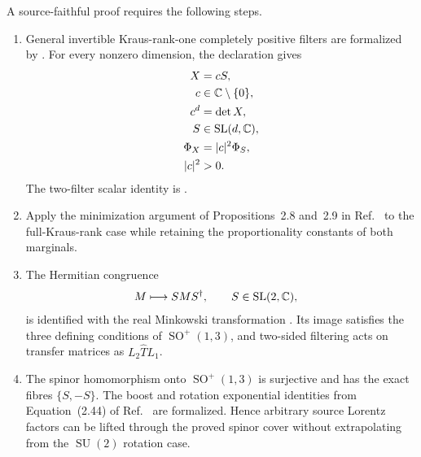 \documentclass{article}
\begin{document}
A source-faithful proof requires the following steps.
\begin{enumerate}
    \item[$\checkmark$] General invertible Kraus-rank-one completely positive
    filters are formalized by . For every
    nonzero dimension, the declaration
     gives
    \begin{align}
        X
            &=cS,
        \label{eq:wolf_prop2_11_lorentz_scalar_filtering_gap_general_dimension_factorization}\\
        c
            &\in\mathbb{C}\setminus\{0\},
        \label{eq:wolf_prop2_11_lorentz_scalar_filtering_gap_nonzero_scalar}\\
        c^d
            &=\det X,
        \label{eq:wolf_prop2_11_lorentz_scalar_filtering_gap_general_dimension_root}\\
        S
            &\in\operatorname{SL}(d,\mathbb{C}),
        \label{eq:wolf_prop2_11_lorentz_scalar_filtering_gap_general_dimension_sl}\\
        \Phi_X
            &=|c|^2\Phi_S,
        \label{eq:wolf_prop2_11_lorentz_scalar_filtering_gap_general_dimension_filter}\\
        |c|^2
            &>0.
        \label{eq:wolf_prop2_11_lorentz_scalar_filtering_gap_positive_scalar}
    \end{align}
    The two-filter scalar identity is
    .

    \item Apply the minimization argument of Propositions~2.8 and~2.9 in
    Ref.~\cite{Wolf2012Quantum} to the full-Kraus-rank case while retaining
    the proportionality constants of both marginals.

    \item[$\checkmark$] The Hermitian congruence
    \begin{align}
        M
            &\longmapsto SMS^\dagger,
            \qquad S\in\operatorname{SL}(2,\mathbb{C}),
        \label{eq:wolf_prop2_11_lorentz_scalar_filtering_gap_spinor_congruence}
    \end{align}
    is identified with the real Minkowski transformation
    . Its image satisfies the three defining
    conditions of $\operatorname{SO}^{+}(1,3)$, and two-sided filtering acts
    on transfer matrices as $L_2\widehat T L_1$.

    \item[$\checkmark$] The spinor homomorphism onto
    $\operatorname{SO}^{+}(1,3)$ is surjective and has the exact fibres
    $\{S,-S\}$. The boost and rotation exponential identities from
    Equation~(2.44) of Ref.~\cite{Wolf2012Quantum} are formalized. Hence
    arbitrary source Lorentz factors can be lifted through the proved spinor
    cover without extrapolating from the $\operatorname{SU}(2)$ rotation
    case.


\end{enumerate}
\end{document}
